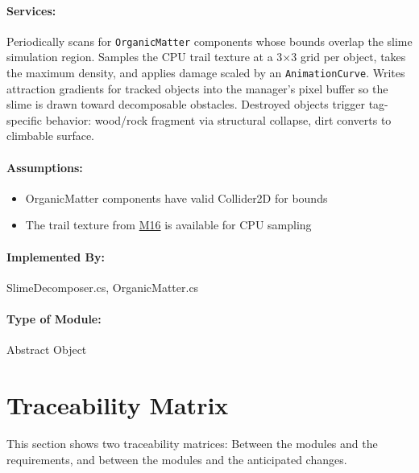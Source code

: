 \documentclass[12pt, titlepage]{article}
\begin{document}
\paragraph{Services:}
Periodically scans for \texttt{OrganicMatter} components whose bounds overlap the slime
simulation region. Samples the CPU trail texture at a 3$\times$3 grid per object, takes the
maximum density, and applies damage scaled by an \texttt{AnimationCurve}. Writes attraction
gradients for tracked objects into the manager's pixel buffer so the slime is drawn toward
decomposable obstacles. Destroyed objects trigger tag-specific behavior: wood/rock fragment via
structural collapse, dirt converts to climbable surface.

\paragraph{Assumptions:}
\begin{itemize}
\item OrganicMatter components have valid Collider2D for bounds
\item The trail texture from \hyperref[M16]{M16} is available for CPU sampling
\end{itemize}

\paragraph{Implemented By:}
SlimeDecomposer.cs, OrganicMatter.cs

\paragraph{Type of Module:}
Abstract Object

\newpage

\section{Traceability Matrix} \label{SecTM}

This section shows two traceability matrices: Between the modules and the
requirements, and between the modules and the anticipated changes.
\end{document}
